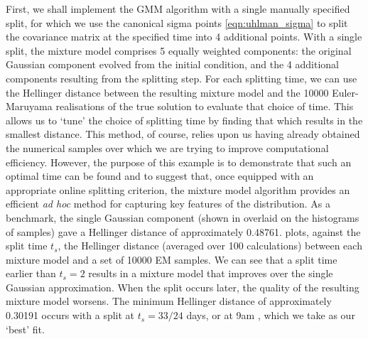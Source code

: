 First, we shall implement the GMM algorithm with a single manually specified split, for which we use the canonical sigma points \cref{eqn:uhlman_sigma} to split the covariance matrix at the specified time into 4 additional points.
With a single split, the mixture model comprises 5 equally weighted components: the original Gaussian component evolved from the initial condition, and the 4 additional components resulting from the splitting step.
For each splitting time, we can use the Hellinger distance between the resulting mixture model and the 10000 Euler-Maruyama realisations of the true solution to evaluate that choice of time.
This allows us to `tune' the choice of splitting time by finding that which results in the smallest distance.
This method, of course, relies upon us having already obtained the numerical samples over which we are trying to improve computational efficiency.
However, the purpose of this example is to demonstrate that such an optimal time can be found and to suggest that, once equipped with an appropriate online splitting criterion, the mixture model algorithm provides an efficient \emph{ad hoc} method for capturing key features of the distribution.
As a benchmark, the single Gaussian component (shown in  overlaid on the histograms of samples) gave a Hellinger distance of approximately 0.48761.
 plots, against the split time \(t_s\), the Hellinger distance (averaged over 100 calculations) between each mixture model and a set of 10000 EM samples.
We can see that a split time earlier than \(t_s = 2\) results in a mixture model that improves over the single Gaussian approximation.
When the split occurs later, the quality of the resulting mixture model worsens.
The minimum Hellinger distance of approximately 0.30191 occurs with a split at \(t_s = 33/24\) days, or at 9am , which we take as our `best' fit.

